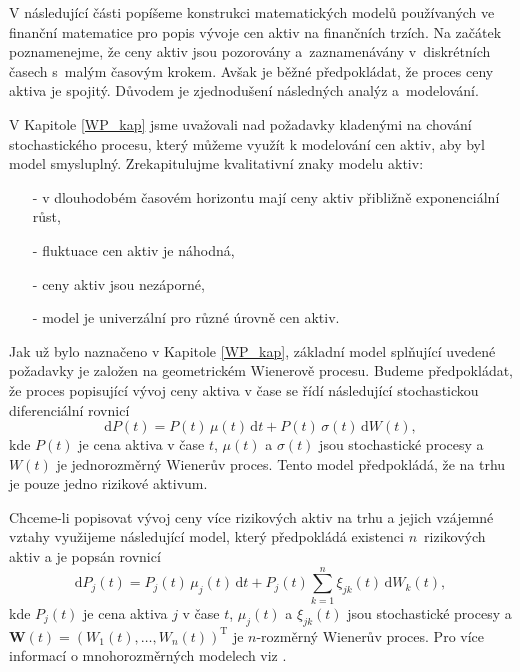 \documentclass[a4paper,12pt]{report}
\theoremstyle{definition} \newtheorem{definice}[veta]{Definice}
\theoremstyle{remark}
\begin{document}
V následující části popíšeme konstrukci matematických modelů používaných ve finanční matematice pro popis vývoje cen aktiv na finančních trzích.
Na začátek poznamenejme, že ceny aktiv jsou pozorovány a~zaznamenávány v~diskrétních časech s~malým časovým krokem.
Avšak je běžné předpokládat, že proces ceny aktiva je spojitý.
Důvodem je zjednodušení následných analýz a~modelování.

V Kapitole \ref{WP_kap} jsme uvažovali nad požadavky kladenými na chování stochastického procesu, který můžeme využít k modelování cen aktiv, aby byl model smysluplný.
Zrekapitulujme kvalitativní znaky modelu aktiv:
\begin{itemize}
\item[-] v dlouhodobém časovém horizontu mají ceny aktiv přibližně exponenciální růst,
\item[-] fluktuace cen aktiv je náhodná,
\item[-] ceny aktiv jsou nezáporné,
\item[-] model je univerzální pro různé úrovně cen aktiv.
\end{itemize}
Jak už bylo naznačeno v Kapitole \ref{WP_kap}, základní model splňující uvedené požadavky je založen na geometrickém Wienerově procesu. 
Budeme předpokládat, že proces popisující vývoj ceny aktiva v čase se řídí následující stochastickou diferenciální rovnicí %
\begin{equation}\label{risk_asset_model}
\mathrm{d}P(t)=P(t)\,\mu(t)\,\mathrm{d}t+P(t)\,\sigma(t)\,\mathrm{d}W(t),
\end{equation}
kde $P(t)$ je cena aktiva v čase $t$, $\mu(t)$ a $\sigma(t)$ jsou stochastické procesy a $W(t)$  je jednorozměrný Wienerův proces.
Tento model předpokládá, že na trhu je pouze jedno rizikové aktivum.%

Chceme-li popisovat vývoj ceny více rizikových aktiv na trhu a jejich vzájemné vztahy využijeme následující model, který předpokládá existenci $n$~rizikových aktiv a je popsán rovnicí
\begin{equation}\label{multi_risk_asset_model}
\mathrm{d}P_j(t)=P_j(t)\,\mu_j(t)\,\mathrm{d}t+P_j(t)\sum_{k=1}^{n}\xi_{jk}(t)\,\mathrm{d}W_k(t),
\end{equation}
kde $P_j(t)$ je cena aktiva $j$ v čase $t$, $\mu_j(t)$ a $\xi_{jk}(t)$ jsou stochastické procesy a $\boldsymbol{W}(t)=(W_1(t),\dots,W_n(t))^\mathrm{T}$ je $n$-rozměrný Wienerův proces. 
Pro více informací o mnohorozměrných modelech viz \cite{etheridge2002course}.
\end{document}
